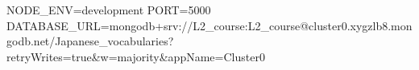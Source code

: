 NODE_ENV=development
PORT=5000
DATABASE_URL=mongodb+srv://L2_course:L2_course@cluster0.xygzlb8.mongodb.net/Japanese_vocabularies?retryWrites=true&w=majority&appName=Cluster0
